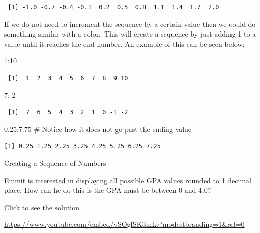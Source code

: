 \documentclass[
  letterpaper,
  DIV=11,
  numbers=noendperiod]{scrreprt}
\newenvironment{Shaded}{\begin{snugshade}}{\end{snugshade}}
\newcommand{\CommentTok}[1]{\textcolor[rgb]{0.37,0.37,0.37}{#1}}
\newcommand{\DecValTok}[1]{\textcolor[rgb]{0.68,0.00,0.00}{#1}}
\newcommand{\FloatTok}[1]{\textcolor[rgb]{0.68,0.00,0.00}{#1}}
\newcommand{\SpecialCharTok}[1]{\textcolor[rgb]{0.37,0.37,0.37}{#1}}
\begin{document}
\begin{verbatim}
 [1] -1.0 -0.7 -0.4 -0.1  0.2  0.5  0.8  1.1  1.4  1.7  2.0
\end{verbatim}

If we do not need to increment the sequence by a certain value then we
could do something similar with a colon. This will create a sequence by
just adding 1 to a value until it reaches the end number. An example of
this can be seen below:

\begin{Shaded}
\begin{Highlighting}[]
\DecValTok{1}\SpecialCharTok{:}\DecValTok{10}
\end{Highlighting}
\end{Shaded}

\begin{verbatim}
 [1]  1  2  3  4  5  6  7  8  9 10
\end{verbatim}

\begin{Shaded}
\begin{Highlighting}[]
\DecValTok{7}\SpecialCharTok{:{-}}\DecValTok{2}
\end{Highlighting}
\end{Shaded}

\begin{verbatim}
 [1]  7  6  5  4  3  2  1  0 -1 -2
\end{verbatim}

\begin{Shaded}
\begin{Highlighting}[]
\FloatTok{0.25}\SpecialCharTok{:}\FloatTok{7.75} \CommentTok{\# Notice how it does not go past the ending value}
\end{Highlighting}
\end{Shaded}

\begin{verbatim}
[1] 0.25 1.25 2.25 3.25 4.25 5.25 6.25 7.25
\end{verbatim}

\begin{watch}{}{}
    \href{https://youtu.be/c4qJ3Y5hJ0s}{Creating a Sequence of Numbers}
\end{watch}

\begin{tcolorbox}[enhanced jigsaw, leftrule=.75mm, arc=.35mm, coltitle=black, rightrule=.15mm, bottomrule=.15mm, toprule=.15mm, left=2mm, colbacktitle=quarto-callout-tip-color!10!white, title=\textcolor{quarto-callout-tip-color}{\faLightbulb}\hspace{0.5em}{Try it Out}, toptitle=1mm, breakable, colframe=quarto-callout-tip-color-frame, bottomtitle=1mm, titlerule=0mm, colback=white, opacityback=0, opacitybacktitle=0.6]

Emmit is interested in displaying all possible GPA values rounded to 1
decimal place. How can he do this is the GPA must be between 0 and 4.0?

Click to see the solution

\url{https://www.youtube.com/embed/vSOgfSK3mLc?modestbranding=1&rel=0}

\end{tcolorbox}
\end{document}
